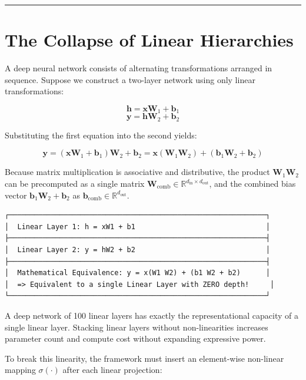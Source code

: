 \documentclass[
  letterpaper,
]{scrbook}
\begin{document}
\begin{center}\rule{0.5\linewidth}{0.5pt}\end{center}

\section{The Collapse of Linear
Hierarchies}\label{the-collapse-of-linear-hierarchies}

A deep neural network consists of alternating transformations arranged
in sequence. Suppose we construct a two-layer network using only linear
transformations:

\[\mathbf{h} = \mathbf{x} \mathbf{W}_1 + \mathbf{b}_1\]
\[\mathbf{y} = \mathbf{h} \mathbf{W}_2 + \mathbf{b}_2\]

Substituting the first equation into the second yields:

\[\mathbf{y} = (\mathbf{x} \mathbf{W}_1 + \mathbf{b}_1)\mathbf{W}_2 + \mathbf{b}_2 = \mathbf{x}(\mathbf{W}_1 \mathbf{W}_2) + (\mathbf{b}_1 \mathbf{W}_2 + \mathbf{b}_2)\]

Because matrix multiplication is associative and distributive, the
product \(\mathbf{W}_1 \mathbf{W}_2\) can be precomputed as a single
matrix
\(\mathbf{W}_{\text{comb}} \in \mathbb{R}^{d_{\text{in}} \times d_{\text{out}}}\),
and the combined bias vector
\(\mathbf{b}_1 \mathbf{W}_2 + \mathbf{b}_2\) as
\(\mathbf{b}_{\text{comb}} \in \mathbb{R}^{d_{\text{out}}}\).

\begin{verbatim}
┌─────────────────────────────────────────────────────────────┐
│  Linear Layer 1: h = xW1 + b1                               │
├─────────────────────────────────────────────────────────────┤
│  Linear Layer 2: y = hW2 + b2                               │
├─────────────────────────────────────────────────────────────┤
│  Mathematical Equivalence: y = x(W1 W2) + (b1 W2 + b2)      │
│  => Equivalent to a single Linear Layer with ZERO depth!     │
└─────────────────────────────────────────────────────────────┘
\end{verbatim}

A deep network of 100 linear layers has exactly the representational
capacity of a single linear layer. Stacking linear layers without
non-linearities increases parameter count and compute cost without
expanding expressive power.

To break this linearity, the framework must insert an element-wise
non-linear mapping \(\sigma(\cdot)\) after each linear projection:
\end{document}
